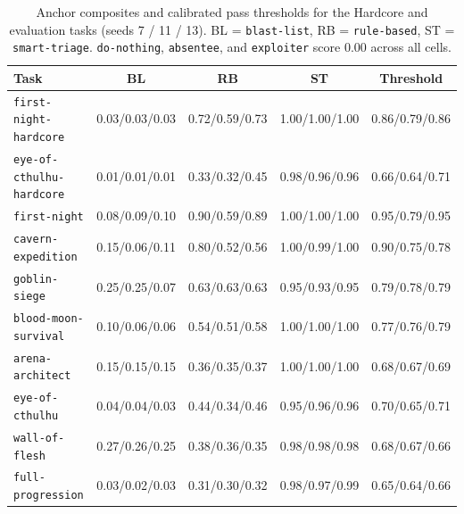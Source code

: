 \documentclass[10pt,letterpaper]{article}
\begin{document}
\begin{table}[h]
\centering
\caption{Anchor composites and calibrated pass thresholds for the Hardcore and evaluation tasks (seeds 7 / 11 / 13). BL = \texttt{blast-list}, RB = \texttt{rule-based}, ST = \texttt{smart-triage}. \texttt{do-nothing}, \texttt{absentee}, and \texttt{exploiter} score $0.00$ across all cells.}
\label{tab:calibration}
\begin{tabular}{lcccc}
\toprule
Task & BL & RB & ST & Threshold \\
\midrule
\texttt{first-night-hardcore} & 0.03/0.03/0.03 & 0.72/0.59/0.73 & 1.00/1.00/1.00 & 0.86/0.79/0.86 \\
\texttt{eye-of-cthulhu-hardcore} & 0.01/0.01/0.01 & 0.33/0.32/0.45 & 0.98/0.96/0.96 & 0.66/0.64/0.71 \\
\texttt{first-night} & 0.08/0.09/0.10 & 0.90/0.59/0.89 & 1.00/1.00/1.00 & 0.95/0.79/0.95 \\
\texttt{cavern-expedition} & 0.15/0.06/0.11 & 0.80/0.52/0.56 & 1.00/0.99/1.00 & 0.90/0.75/0.78 \\
\texttt{goblin-siege} & 0.25/0.25/0.07 & 0.63/0.63/0.63 & 0.95/0.93/0.95 & 0.79/0.78/0.79 \\
\texttt{blood-moon-survival} & 0.10/0.06/0.06 & 0.54/0.51/0.58 & 1.00/1.00/1.00 & 0.77/0.76/0.79 \\
\texttt{arena-architect} & 0.15/0.15/0.15 & 0.36/0.35/0.37 & 1.00/1.00/1.00 & 0.68/0.67/0.69 \\
\texttt{eye-of-cthulhu} & 0.04/0.04/0.03 & 0.44/0.34/0.46 & 0.95/0.96/0.96 & 0.70/0.65/0.71 \\
\texttt{wall-of-flesh} & 0.27/0.26/0.25 & 0.38/0.36/0.35 & 0.98/0.98/0.98 & 0.68/0.67/0.66 \\
\texttt{full-progression} & 0.03/0.02/0.03 & 0.31/0.30/0.32 & 0.98/0.97/0.99 & 0.65/0.64/0.66 \\
\bottomrule
\end{tabular}
\end{table}
\end{document}
